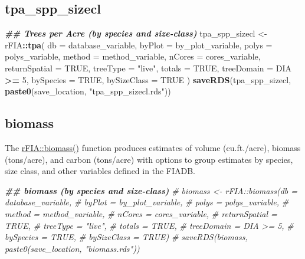\documentclass[
]{book}
\newenvironment{Shaded}{\begin{snugshade}}{\end{snugshade}}
\newcommand{\AttributeTok}[1]{\textcolor[rgb]{0.13,0.29,0.53}{#1}}
\newcommand{\CommentTok}[1]{\textcolor[rgb]{0.56,0.35,0.01}{\textit{#1}}}
\newcommand{\ConstantTok}[1]{\textcolor[rgb]{0.56,0.35,0.01}{#1}}
\newcommand{\DecValTok}[1]{\textcolor[rgb]{0.00,0.00,0.81}{#1}}
\newcommand{\DocumentationTok}[1]{\textcolor[rgb]{0.56,0.35,0.01}{\textbf{\textit{#1}}}}
\newcommand{\FunctionTok}[1]{\textcolor[rgb]{0.13,0.29,0.53}{\textbf{#1}}}
\newcommand{\NormalTok}[1]{#1}
\newcommand{\OtherTok}[1]{\textcolor[rgb]{0.56,0.35,0.01}{#1}}
\newcommand{\SpecialCharTok}[1]{\textcolor[rgb]{0.81,0.36,0.00}{\textbf{#1}}}
\newcommand{\StringTok}[1]{\textcolor[rgb]{0.31,0.60,0.02}{#1}}
\begin{document}
\hypertarget{tpa_spp_sizecl}{%
\subsection{tpa\_spp\_sizecl}\label{tpa_spp_sizecl}}

\begin{Shaded}
\begin{Highlighting}[]
\DocumentationTok{\#\# Trees per Acre (by species and size{-}class)}
\NormalTok{tpa\_spp\_sizecl }\OtherTok{\textless{}{-}}\NormalTok{ rFIA}\SpecialCharTok{::}\FunctionTok{tpa}\NormalTok{(}
  \AttributeTok{db =}\NormalTok{ database\_variable,}
  \AttributeTok{byPlot =}\NormalTok{ by\_plot\_variable,}
  \AttributeTok{polys =}\NormalTok{ polys\_variable,}
  \AttributeTok{method =}\NormalTok{ method\_variable,}
  \AttributeTok{nCores =}\NormalTok{ cores\_variable,}
  \AttributeTok{returnSpatial =} \ConstantTok{TRUE}\NormalTok{,}
  \AttributeTok{treeType =} \StringTok{"live"}\NormalTok{,}
  \AttributeTok{totals =} \ConstantTok{TRUE}\NormalTok{,}
  \AttributeTok{treeDomain =}\NormalTok{ DIA }\SpecialCharTok{\textgreater{}=} \DecValTok{5}\NormalTok{,}
  \AttributeTok{bySpecies =} \ConstantTok{TRUE}\NormalTok{,}
  \AttributeTok{bySizeClass =} \ConstantTok{TRUE}
\NormalTok{)}
\FunctionTok{saveRDS}\NormalTok{(tpa\_spp\_sizecl, }\FunctionTok{paste0}\NormalTok{(save\_location, }\StringTok{"tpa\_spp\_sizecl.rds"}\NormalTok{))}
\end{Highlighting}
\end{Shaded}

\hypertarget{biomass}{%
\subsection{biomass}\label{biomass}}

The \href{https://rdrr.io/cran/rFIA/man/biomass.html}{rFIA::biomass()} function produces estimates of volume (cu.ft./acre), biomass (tons/acre), and carbon (tons/acre) with options to group estimates by species, size class, and other variables defined in the FIADB.

\begin{Shaded}
\begin{Highlighting}[]
\DocumentationTok{\#\# biomass (by species and size{-}class)}
\CommentTok{\# biomass \textless{}{-} rFIA::biomass(db = database\_variable,}
\CommentTok{\#            byPlot = by\_plot\_variable,}
\CommentTok{\#            polys = polys\_variable, }
\CommentTok{\#            method = method\_variable,}
\CommentTok{\#            nCores = cores\_variable,}
\CommentTok{\#            returnSpatial = TRUE,}
\CommentTok{\#            treeType = "live",}
\CommentTok{\#            totals = TRUE,}
\CommentTok{\#            treeDomain = DIA \textgreater{}= 5,}
\CommentTok{\#            bySpecies = TRUE, }
\CommentTok{\#            bySizeClass = TRUE) }
\CommentTok{\# saveRDS(biomass, paste0(save\_location, "biomass.rds"))}
\end{Highlighting}
\end{Shaded}
\end{document}
